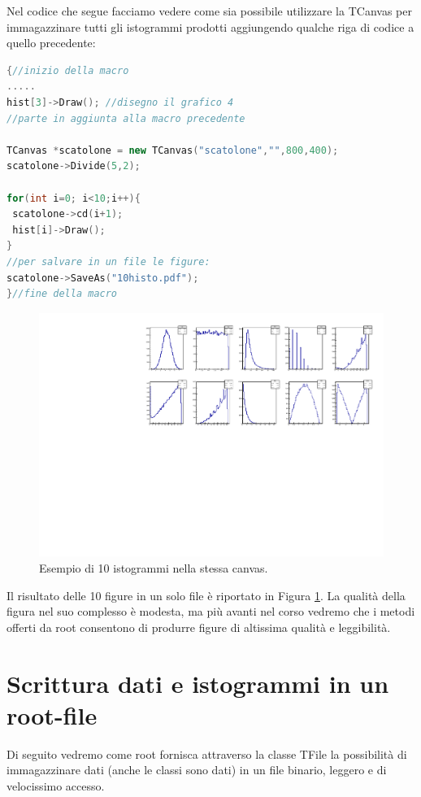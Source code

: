\documentclass[11pt,fleqn]{book} %
\begin{document}
Nel codice che segue facciamo vedere come sia possibile utilizzare la TCanvas per immagazzinare tutti gli istogrammi prodotti aggiungendo qualche riga di codice a quello precedente:

\begin{lstlisting}[language=c++]
{//inizio della macro
.....
hist[3]->Draw(); //disegno il grafico 4
//parte in aggiunta alla macro precedente

TCanvas *scatolone = new TCanvas("scatolone","",800,400);
scatolone->Divide(5,2);

for(int i=0; i<10;i++){
 scatolone->cd(i+1);
 hist[i]->Draw();
}
//per salvare in un file le figure:
scatolone->SaveAs("10histo.pdf");
}//fine della macro
\end{lstlisting}


\begin{figure}[htb]
\centering
\includegraphics[scale=0.7]{Pictures/10histo.pdf}
\caption{Esempio di 10 istogrammi nella stessa canvas. \label{10h}}
\end{figure}
Il risultato delle 10 figure in un solo file è riportato in Figura \ref{10h}. La qualità della figura nel suo complesso è modesta, ma più avanti nel corso vedremo che i metodi offerti da root consentono di produrre figure di altissima qualità e leggibilità.

\section{Scrittura dati e istogrammi in un root-file}

Di seguito vedremo come root fornisca attraverso la classe TFile la possibilità di immagazzinare dati (anche le classi sono dati) in un file binario, leggero e di velocissimo accesso.
\end{document}
